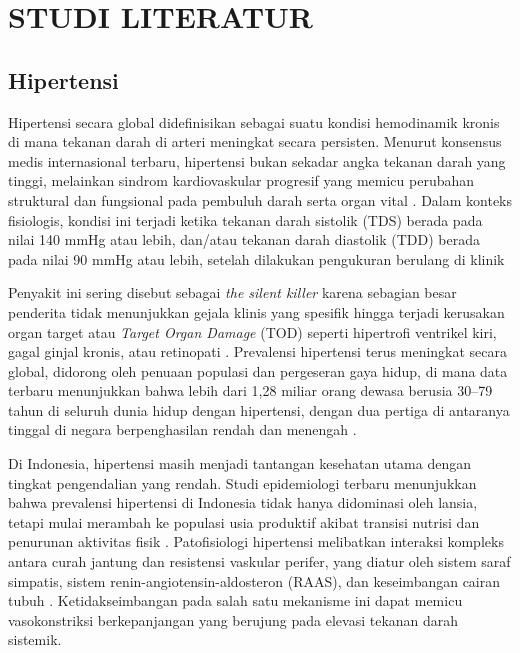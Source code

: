 \chapter{STUDI LITERATUR}
\label{chap:studi-literatur}

\section{Hipertensi}
Hipertensi secara global didefinisikan sebagai suatu kondisi hemodinamik kronis di mana tekanan darah di arteri meningkat secara persisten. Menurut konsensus medis internasional terbaru, hipertensi bukan sekadar angka tekanan darah yang tinggi, melainkan sindrom kardiovaskular progresif yang memicu perubahan struktural dan fungsional pada pembuluh darah serta organ vital \parencite{Unger2020International}. Dalam konteks fisiologis, kondisi ini terjadi ketika tekanan darah sistolik (TDS) berada pada nilai 140 mmHg atau lebih, dan/atau tekanan darah diastolik (TDD) berada pada nilai 90 mmHg atau lebih, setelah dilakukan pengukuran berulang di klinik \parencite{ramzy_hypertension_definition} 

Penyakit ini sering disebut sebagai \textit{the silent killer} karena sebagian besar penderita tidak menunjukkan gejala klinis yang spesifik hingga terjadi kerusakan organ target atau \textit{Target Organ Damage}  (TOD) seperti hipertrofi ventrikel kiri, gagal ginjal kronis, atau retinopati \parencite{Mills2020Global}. Prevalensi hipertensi terus meningkat secara global, didorong oleh penuaan populasi dan pergeseran gaya hidup, di mana data terbaru menunjukkan bahwa lebih dari 1,28 miliar orang dewasa berusia 30--79 tahun di seluruh dunia hidup dengan hipertensi, dengan dua pertiga di antaranya tinggal di negara berpenghasilan rendah dan menengah \parencite{WHO2023}.

Di Indonesia, hipertensi masih menjadi tantangan kesehatan utama dengan tingkat pengendalian yang rendah. Studi epidemiologi terbaru menunjukkan bahwa prevalensi hipertensi di Indonesia tidak hanya didominasi oleh lansia, tetapi mulai merambah ke populasi usia produktif akibat transisi nutrisi dan penurunan aktivitas fisik \parencite{Trianaputri2023FaktorFaktor}. Patofisiologi hipertensi melibatkan interaksi kompleks antara curah jantung dan resistensi vaskular perifer, yang diatur oleh sistem saraf simpatis, sistem renin-angiotensin-aldosteron (RAAS), dan keseimbangan cairan tubuh \parencite{Kaufman1997BP_BMI_Lean}. Ketidakseimbangan pada salah satu mekanisme ini dapat memicu vasokonstriksi berkepanjangan yang berujung pada elevasi tekanan darah sistemik.





